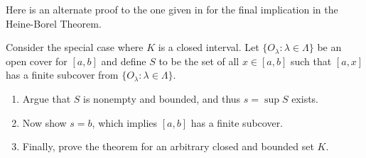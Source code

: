 \documentclass{lew98_solutions}
\begin{document}
\begin{exercise}
\label{ex:3.3.10}
    Here is an alternate proof to the one given in  for the final implication in the Heine-Borel Theorem.

    Consider the special case where \( K \) is a closed interval. Let \( \{ O_{\lambda} : \lambda \in \Lambda \} \) be an open cover for \( [a, b] \) and define \( S \) to be the set of all \( x \in [a, b] \) such that \( [a, x] \) has a finite subcover from \( \{ O_{\lambda} : \lambda \in \Lambda \} \).
    \begin{enumerate}
        \item Argue that \( S \) is nonempty and bounded, and thus \( s = \sup S \) exists.

        \item Now show \( s = b \), which implies \( [a, b] \) has a finite subcover.

        \item Finally, prove the theorem for an arbitrary closed and bounded set \( K \).
    \end{enumerate}
\end{exercise}
\end{document}
